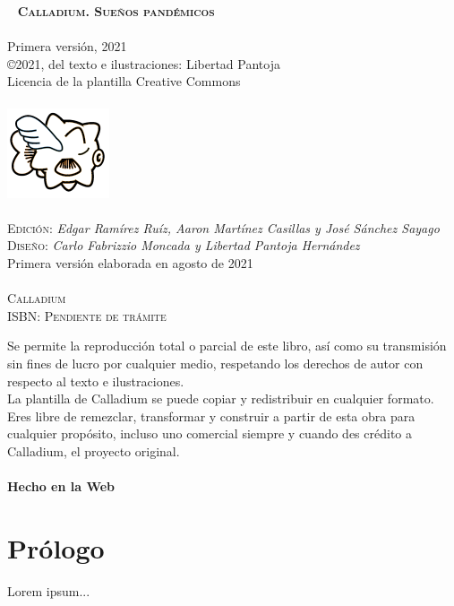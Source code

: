 \documentclass[12pt]{book}
\begin{document}
\newpage
\thispagestyle{empty}
~\vfill
\noindent \textsc{\textbf{Calladium. Sueños pandémicos}}\\ %
\\
\noindent Primera versión, 2021
\\
\noindent  \copyright  2021, del texto e ilustraciones: Libertad Pantoja\\ %
Licencia de la plantilla \noindent Creative Commons \ccby \\
\\
\includegraphics{ffugu.png}
\\\\
\noindent \textsc{Edición:} \textit{Edgar Ramírez Ruíz, Aaron Martínez Casillas y José Sánchez Sayago}\\ %
\noindent \textsc{Diseño:} \textit{Carlo Fabrizzio Moncada y Libertad Pantoja Hernández}\\
\noindent Primera versión elaborada en agosto de 2021 \\\\ %

\noindent \textsc{Calladium}\\
\noindent \textsc{ISBN: Pendiente de trámite}\\
\noindent \small{
Se permite la reproducción total o parcial de este libro, así
como su transmisión sin fines de lucro por cualquier medio,
 respetando los derechos de autor con respecto al texto e ilustraciones.\\
La plantilla de Calladium se puede copiar y redistribuir en cualquier formato. Eres libre
de remezclar, transformar y construir a partir de esta obra para cualquier propósito, incluso uno comercial siempre y cuando des crédito a Calladium, el proyecto original.
\\
\\
\textbf{Hecho en la Web}
 
 }


\mainmatter

\tableofcontents

\chapter{Prólogo}
Lorem ipsum...
\end{document}
